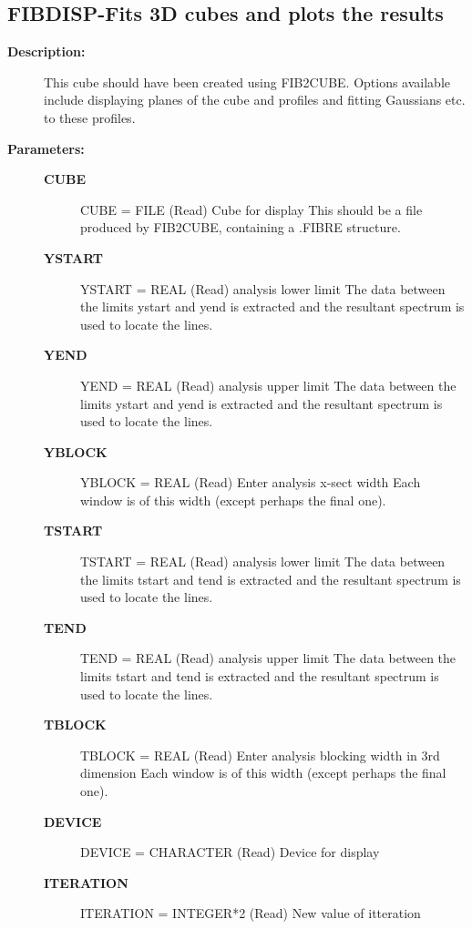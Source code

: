 \subsection{FIBDISP-\label{FIBDISP}Fits 3D cubes and plots the results}
\begin{description}

\item [{\bf Description:}]
    This cube should have been created using FIB2CUBE. Options available
    include displaying planes of the cube and profiles and fitting
    Gaussians etc. to these profiles.

\item [{\bf Parameters:}]
\begin{description}
\item [{\bf CUBE}]
    CUBE = FILE (Read)
        Cube for display
          This should be a file produced by FIB2CUBE, containing
          a .FIBRE structure.
\item [{\bf YSTART}]
    YSTART = REAL (Read)
        analysis lower limit
            The data between the limits ystart and yend is extracted
            and the resultant spectrum is used to locate the lines.
\item [{\bf YEND}]
    YEND = REAL (Read)
        analysis upper limit
            The data between the limits ystart and yend is extracted
            and the resultant spectrum is used to locate the lines.
\item [{\bf YBLOCK}]
    YBLOCK = REAL (Read)
        Enter analysis x-sect width
            Each window is of this width (except perhaps the final one).
\item [{\bf TSTART}]
    TSTART = REAL (Read)
        analysis lower limit
            The data between the limits tstart and tend is extracted
            and the resultant spectrum is used to locate the lines.
\item [{\bf TEND}]
    TEND = REAL (Read)
        analysis upper limit
            The data between the limits tstart and tend is extracted
            and the resultant spectrum is used to locate the lines.
\item [{\bf TBLOCK}]
    TBLOCK = REAL (Read)
        Enter analysis blocking width in 3rd dimension
            Each window is of this width (except perhaps the final one).
\item [{\bf DEVICE}]
    DEVICE = CHARACTER (Read)
        Device for display
\item [{\bf ITERATION}]
    ITERATION = INTEGER*2 (Read)
        New value of itteration

\end{description}
\end{description}
